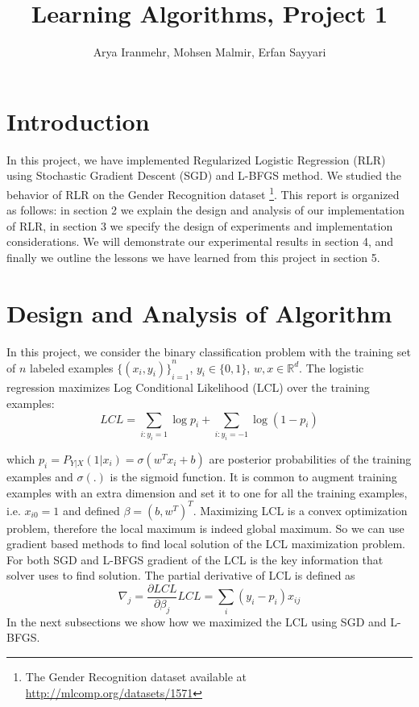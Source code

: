 \documentclass[twoside,12pt]{article}
\begin{document}
\title{Learning Algorithms, Project 1}
\author{Arya Iranmehr, Mohsen Malmir, Erfan Sayyari}
\maketitle

\section{Introduction}
In this project, we have implemented Regularized Logistic Regression (RLR) using Stochastic Gradient Descent (SGD) and L-BFGS method. We studied the behavior of RLR on the Gender Recognition dataset \footnote{The Gender Recognition dataset available at \url{http://mlcomp.org/datasets/1571}}. This report is organized as follows: in section 2 we explain the design and analysis of our implementation of RLR, in section 3 we specify the design of experiments and implementation considerations. We will demonstrate our experimental results in section 4, and finally we outline the lessons we have learned from this project in section 5.

\section{Design and Analysis of Algorithm}
In this project, we consider the binary classification problem with the training set of $n$ labeled examples ${\{(x_i,y_i)\}}^{n}_{i=1}$, $y_i \in \{0,1\}$, $w,x \in \mathbb{R}^d$. The logistic regression maximizes Log Conditional Likelihood (LCL) over the training examples:
\begin{equation}
LCL=\sum_{i:y_i=1} \log p_i +\sum_{i:y_i=-1} \log (1-p_i)
\label{eq:LCL}
\end{equation}

which $p_i=P_{Y|X}(1|x_i)=\sigma(w^Tx_i +b)$ are posterior probabilities of the training examples and $\sigma(.)$ is the sigmoid function. 
It is common to augment training examples with an extra dimension and set it to one for all the training examples,  i.e. $x_{i0}=1$ and defined $\beta=(b, w^T)^T$.
Maximizing LCL is a convex optimization problem, therefore the local maximum is indeed global maximum. So we can use gradient based methods to find local solution of the LCL maximization problem. For both SGD and L-BFGS gradient of the LCL is the key information that solver uses to find solution. The partial derivative of LCL is defined as
\begin{equation}
\nabla_j=\frac{\partial LCL }{\partial \beta_j}LCL=\sum_{i} (y_i-p_i)x_{ij}
\label{eq:pLCL}
\end{equation}
 In the next subsections we show how we maximized the LCL using SGD and L-BFGS.
\end{document}
